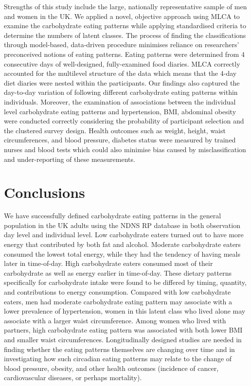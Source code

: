 Strengths of this study include the large, nationally representative sample of men and women in the UK. We applied a novel, objective approach using MLCA to examine the carbohydrate eating patterns while applying standardised criteria to determine the numbers of latent classes. The process of finding the classifications through model-based, data-driven procedure minimises reliance on researchers' preconceived notions of eating patterns. Eating patterns were determined from 4 consecutive days of well-designed, fully-examined food diaries. MLCA correctly accounted for the multilevel structure of the data which means that the 4-day diet diaries were nested within the participants. Our findings also captured the day-to-day variation of following different carbohydrate eating patterns within individuals. Moreover, the examination of associations between the individual level carbohydrate eating patterns and hypertension, BMI, abdominal obesity were conducted correctly considering the probability of participant selection and the clustered survey design. Health outcomes such as weight, height, waist circumferences, and blood pressure, diabetes status were measured by trained nurses and blood tests which could also minimise bias caused by misclassification and under-reporting of these measurements.

\section{Conclusions}

We have successfully defined carbohydrate eating patterns in the general population in the UK adults using the NDNS RP database in both observation day level and individual level. Low carbohydrate eaters turned out to have more energy that contributed by both fat and alcohol. Moderate carbohydrate eaters consumed the lowest total energy, while they had the tendency of having meals later in time-of-day. High carbohydrate eaters consumed most of their carbohydrate as well as energy earlier in time-of-day. These dietary patterns specifically for carbohydrate intake were found to be differed by timing, quantity, and contributions to energy consumption. Compared with low carbohydrate eaters, men had moderate carbohydrate eating pattern may associate with a lower prevalence of hypertension, women in this latent class who lived alone may associate with a larger waist circumference. Among women who lived with partners, high carbohydrate eating pattern was associated with both lower BMI and smaller waist circumferences. Longitudinally designed studies are needed in finding whether the eating patterns themselves are changing over time and in investigating how such circadian eating patterns may relate to the change of blood pressure, obesity, and other health outcomes (incidence of cancer, cardiovascular diseases, or perhaps mortality).